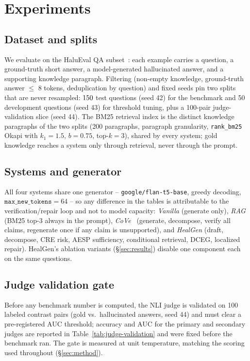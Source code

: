 ﻿%
\section{Experiments}
\label{sec:experiments}

\subsection{Dataset and splits}
We evaluate on the HaluEval QA subset~\cite{liu2023halueval}: each example
carries a question, a ground-truth short answer, a model-generated
hallucinated answer, and a supporting knowledge paragraph.  Filtering
(non-empty knowledge, ground-truth answer $\le$ 8 tokens, deduplication by
question) and fixed seeds pin two splits that are never resampled:
$150$ test questions (seed 42) for the benchmark and 50 development
questions (seed 43) for threshold tuning, plus a 100-pair judge-validation
slice (seed 44).  The BM25 retrieval index is the distinct knowledge
paragraphs of the two splits (200 paragraphs, paragraph granularity,
\texttt{rank\_bm25} Okapi with $k_1{=}1.5$, $b{=}0.75$, top-$k{=}3$),
shared by every system; gold knowledge reaches a system only through
retrieval, never through the prompt.

\subsection{Systems and generator}
All four systems share one generator -- \texttt{google/flan-t5-base},
greedy decoding, $\texttt{max\_new\_tokens}{=}64$ -- so any difference in
the tables is attributable to the verification/repair loop and not to
model capacity: \emph{Vanilla} (generate only), \emph{RAG} (BM25 top-3
always in the prompt), \emph{CoVe}~\cite{dhuliawala2023cove}
(generate, decompose, verify all claims, regenerate once if any claim is
unsupported), and \emph{HealGen} (draft, decompose, CRE risk, AESP
sufficiency, conditional retrieval, DCEG, localized repair).
HealGen's ablation variants (\S\ref{sec:results}) disable one component
each on the same questions.

\subsection{Judge validation gate}
Before any benchmark number is computed, the NLI judge is validated on
100 labeled contrast pairs (gold vs.\ hallucinated answers, seed 44) and
must clear a pre-registered AUC threshold; accuracy and AUC for the
primary and secondary judges are reported in
Table~\ref{tab:judge-validation} and were fixed before the benchmark ran.
The gate is measured at unit temperature, matching the scoring used
throughout (\S\ref{sec:method}).

